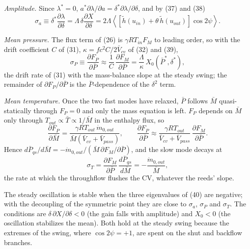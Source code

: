 \documentclass[11pt]{article}
\begin{document}
\emph{Amplitude.} Since $\lambda^* = 0$, $a^*\partial\lambda/\partial a = \delta^*\partial\lambda/\partial\delta$, and by (37) and (38)
\begin{equation}
\sigma_a \equiv \delta^*\frac{\partial\lambda}{\partial\delta} = \Lambda\,\delta\frac{\partial X}{\partial\delta} = 2\Lambda\left\langle\left[\tilde h(u_{in}) + \theta\,\tilde h(u_{out})\right]\cos 2\psi\right\rangle . \tag{41}
\end{equation}

\emph{Mean pressure.} The flux term of (26) is $\gamma RT_{in}F_M$ to leading order, so with the drift coefficient $C$ of (31), $\kappa = fc^2C/2\bar V_{cv}$ of (32) and (39),
\begin{equation}
\sigma_P \equiv \frac{\partial F_P}{\partial\bar P} \approx \frac{1}{C}\,\frac{\partial F_M}{\partial\bar P} = \frac{\Lambda}{\kappa}\,X_0(\bar P^*,\delta^*) , \tag{42}
\end{equation}
the drift rate of (31) with the mass-balance slope at the steady swing; the remainder of $\partial F_P/\partial\bar P$ is the $\bar P$-dependence of the $\delta^2$ term.

\emph{Mean temperature.} Once the two fast modes have relaxed, $\bar P$ follows $\bar M$ quasi-statically through $F_P = 0$ and only the mass equation is left. $F_P$ depends on $\bar M$ only through $T_{out} \propto \bar T \propto 1/\bar M$ in the enthalpy flux, so
\[
\frac{\partial F_P}{\partial\bar M} = \frac{\gamma RT_{out}\,\dot m_{0,out}}{\bar M\left(\bar V_{cv} + \bar V_{pass}\right)}, \qquad \frac{\partial F_P}{\partial\bar P} \approx \frac{\gamma RT_{out}}{\bar V_{cv} + \bar V_{pass}}\,\frac{\partial F_M}{\partial\bar P} .
\] Hence $d\bar P_{qs}/d\bar M = -\dot m_{0,out}/(\bar M\,\partial F_M/\partial\bar P)$, and the slow mode decays at
\begin{equation}
\sigma_T = \frac{\partial F_M}{\partial\bar P}\,\frac{d\bar P_{qs}}{d\bar M} = -\frac{\dot m_{0,out}}{\bar M} , \tag{43}
\end{equation}
the rate at which the throughflow flushes the CV, whatever the reeds' slope.

The steady oscillation is stable when the three eigenvalues of (40) are negative; with the decoupling of the symmetric point they are close to $\sigma_a$, $\sigma_P$ and $\sigma_T$. The conditions are $\delta\,\partial X/\partial\delta < 0$ (the gain falls with amplitude) and $X_0 < 0$ (the oscillation stabilizes the mean). Both hold at the steady swing because the extremes of the swing, where $\cos 2\psi = +1$, are spent on the shut and backflow branches.
\end{document}
